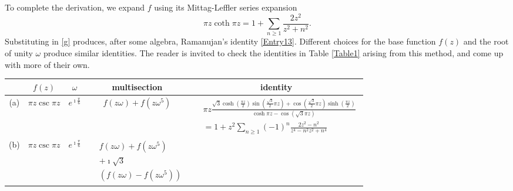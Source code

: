\documentclass[11pt,oneside,reqno]{article}
\theoremstyle{definition}
\providecommand{\tabularnewline}{\\}
\begin{document}
To complete the derivation, we expand $f$ using its Mittag-Leffler series expansion \cite[4.36.3]{NIST} 
\begin{equation}
\label{MittagLeffler}
\pi z\coth \pi z=1+\sum_{n\ge1}\frac{2z^{2}}{z^{2}+n^{2}}.
\end{equation}
Substituting in \eqref{g} produces, after some algebra, Ramanujan's identity \eqref{Entry13}. Different choices for the base function $f(z)$ and the root of unity $\omega$ produce similar identities. The reader is invited to check the identities in Table \ref{Table1} arising from this method, and come up with more of their own.

\begin{table}[h]
\begin{tabular}{|c|c|c|c|c|}
\hline 
 & $f\left(z\right)$  & $\omega$ & multisection & identity\tabularnewline
\hline 
\hline 
(a) & $\pi z\csc\pi z$ & $e^{\imath\frac{\pi}{6}}$ & $f\left(z\omega\right)+f\left(z\omega^{5}\right)$ & 
{$\begin{aligned}
&\pi z\frac{\sqrt{3}\cosh\left(\frac{\pi z}{2}\right)\sin\left(\frac{\sqrt{3}}{2}\pi z\right)+\cos\left(\frac{\sqrt{3}}{2}\pi z\right)\sinh\left(\frac{\pi z}{2}\right)}{\cosh\pi z-\cos\left(\sqrt{3}\pi z\right)}\\
&=1+z^{2}\sum_{n\ge1}\left(-1\right)^{n}\frac{2z^{2}-n^{2}}{z^{4}-n^{2}z^{2}+n^{4}}
\end{aligned}$} \tabularnewline
\hline 
(b) & $\pi z\csc\pi z$ & $e^{\imath\frac{\pi}{6}}$ & {$\begin{aligned}
    &f\left(z\omega\right)+f\left(z\omega^{5}\right)\\
    &+\imath\sqrt{3}\\
    &\left(f\left(z\omega\right)-f\left(z\omega^{5}\right)\right)
\end{aligned}$}


\end{tabular}
\end{table}
\end{document}
